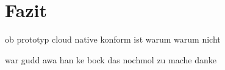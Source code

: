 \chapter{Fazit}

ob prototyp cloud native konform ist
warum warum nicht

war gudd awa han ke bock das nochmol zu mache danke